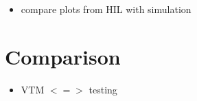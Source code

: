 \documentclass[ExampleMasters.tex]{subfiles}
\begin{document}
\begin{itemize}
	\item compare plots from \gls{HIL}  with simulation
\end{itemize}


\section{Comparison}
\label{sec:results_comparrison}
\begin{itemize}
	\item \gls{VTM}  $<=>$ testing
\end{itemize}
\end{document}
